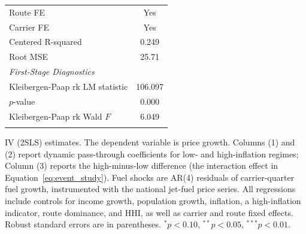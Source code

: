 \begin{table}[p]
{\begin{tabular}{lccc}
Route FE & \multicolumn{3}{c}{Yes} \\
Carrier FE & \multicolumn{3}{c}{Yes} \\
Centered R-squared & \multicolumn{3}{c}{0.249} \\
Root MSE & \multicolumn{3}{c}{25.71} \\
\multicolumn{4}{l}{\textit{First-Stage Diagnostics}} \\
Kleibergen-Paap rk LM statistic & \multicolumn{3}{c}{106.097} \\
\quad \(p\)-value & \multicolumn{3}{c}{0.000} \\
Kleibergen-Paap rk Wald \(F\) & \multicolumn{3}{c}{6.049} \\
\hline \\[-1.8ex]
\end{tabular}
}
\begin{tablenotes}[Note]
IV (2SLS) estimates. The dependent variable is price growth. Columns (1) and (2) report dynamic pass-through coefficients for low- and high-inflation regimes; Column (3) reports the high-minus-low difference (the interaction effect in Equation~\ref{eq:event_study}). Fuel shocks are AR(4) residuals of carrier-quarter fuel growth, instrumented with the national jet-fuel price series. All regressions include controls for income growth, population growth, inflation, a high-inflation indicator, route dominance, and HHI, as well as carrier and route fixed effects. Robust standard errors are in parentheses. \(^{*}p<0.10\), \(^{**}p<0.05\), \(^{***}p<0.01\).
\end{tablenotes}
\end{table}
